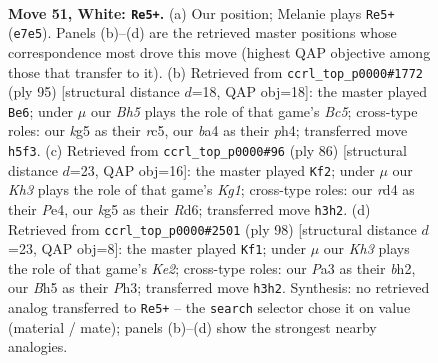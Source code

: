 \documentclass[11pt]{article}
\begin{document}
\clearpage

\begin{figure}[p]\centering
\begin{subfigure}{0.46\textwidth}\centering
\resizebox{\linewidth}{!}{%
\newchessgame
\chessboard[
  setfen={r7/4R3/pp6/6kB/bP1r4/P6K/8/5R2 w - - 4 51},
  showmover=false,
  pgfstyle=straightmove, color=movearrow, markmove={e7-e5}
]}
\caption{}
\end{subfigure}\hfill
\begin{subfigure}{0.46\textwidth}\centering
\resizebox{\linewidth}{!}{%
\newchessgame
\chessboard[
  setfen={5k2/8/5p2/2R1p3/2b1P2P/r7/5K2/1B6 b - - 7 48},
  showmover=false,
  pgfstyle=straightmove, color=movearrow, markmove={c4-e6}
]}
\caption{}
\end{subfigure}
\\[4pt]
\begin{subfigure}{0.46\textwidth}\centering
\resizebox{\linewidth}{!}{%
\newchessgame
\chessboard[
  setfen={4r3/7k/3Rb2P/4p3/1p2P3/6B1/1P6/6K1 w - - 1 44},
  showmover=false,
  pgfstyle=straightmove, color=movearrow, markmove={g1-f2}
]}
\caption{}
\end{subfigure}\hfill
\begin{subfigure}{0.46\textwidth}\centering
\resizebox{\linewidth}{!}{%
\newchessgame
\chessboard[
  setfen={2R5/8/2p3rp/2B5/P3p2k/7P/4K2b/8 w - - 11 50},
  showmover=false,
  pgfstyle=straightmove, color=movearrow, markmove={e2-f1}
]}
\caption{}
\end{subfigure}
\caption{\textbf{Move 51, White: \texttt{Re5+}.} (a) Our position; Melanie plays \texttt{Re5+} (\texttt{e7e5}). Panels (b)--(d) are the retrieved master positions whose correspondence most drove this move (highest QAP objective among those that transfer to it). (b) Retrieved from \texttt{ccrl\_top\_p0000\#1772} (ply 95) [structural distance $d$=18, QAP obj=18]: the master played \texttt{Be6}; under $\mu$ our \emph{Bh5} plays the role of that game's \emph{Bc5}; cross-type roles: our \emph{k}g5 as their \emph{r}c5, our \emph{b}a4 as their \emph{p}h4; transferred move \texttt{h5f3}. (c) Retrieved from \texttt{ccrl\_top\_p0000\#96} (ply 86) [structural distance $d$=23, QAP obj=16]: the master played \texttt{Kf2}; under $\mu$ our \emph{Kh3} plays the role of that game's \emph{Kg1}; cross-type roles: our \emph{r}d4 as their \emph{P}e4, our \emph{k}g5 as their \emph{R}d6; transferred move \texttt{h3h2}. (d) Retrieved from \texttt{ccrl\_top\_p0000\#2501} (ply 98) [structural distance $d$=23, QAP obj=8]: the master played \texttt{Kf1}; under $\mu$ our \emph{Kh3} plays the role of that game's \emph{Ke2}; cross-type roles: our \emph{P}a3 as their \emph{b}h2, our \emph{B}h5 as their \emph{P}h3; transferred move \texttt{h3h2}. Synthesis: no retrieved analog transferred to \texttt{Re5+} -- the \texttt{search} selector chose it on value (material / mate); panels (b)--(d) show the strongest nearby analogies.}
\label{fig:thought-m100}
\end{figure}
\end{document}
